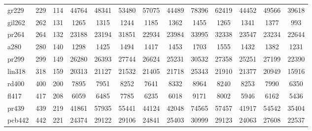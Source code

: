 \documentclass[conference]{IEEEtran}
\begin{document}
\begin{table}[htbp]
{{\begin{tabular}{|l|c|c|c|c|c|c|c|c|c|c|c|c|}
gr229 & 229 & 114 & 44764 & 48341 & 53480 & 57075 & 44489 & 78396 & 62419 & 44452 & 49566 & 39618 \\
gil262 & 262 & 131 & 1265 & 1315 & 1244 & 1185 & 1362 & 1455 & 1265 & 1341 & 1377 & 993 \\
pr264 & 264 & 132 & 23188 & 23194 & 31851 & 22934 & 23984 & 33995 & 32338 & 23547 & 23234 & 22644 \\
a280 & 280 & 140 & 1298 & 1425 & 1494 & 1417 & 1453 & 1703 & 1555 & 1432 & 1382 & 1231 \\
pr299 & 299 & 149 & 26280 & 26393 & 27744 & 26624 & 25231 & 30532 & 27358 & 25251 & 27199 & 22390 \\
lin318 & 318 & 159 & 20313 & 21127 & 21532 & 21405 & 21718 & 25343 & 21910 & 21377 & 20949 & 15916 \\
rd400 & 400 & 200 & 7895 & 7951 & 8252 & 7641 & 8332 & 8964 & 8240 & 8253 & 7990 & 6350 \\
fl417 & 417 & 208 & 6059 & 6485 & 7785 & 6235 & 6018 & 9171 & 8002 & 5946 & 6162 & 5436 \\
pr439 & 439 & 219 & 41861 & 57935 & 55441 & 44124 & 42048 & 74565 & 57457 & 41917 & 54542 & 35404 \\
pcb442 & 442 & 221 & 24374 & 29122 & 29106 & 24841 & 25403 & 30999 & 29123 & 24063 & 27608 & 22537 \\
\hline
\end{tabular}}}
\end{table}
\end{document}
